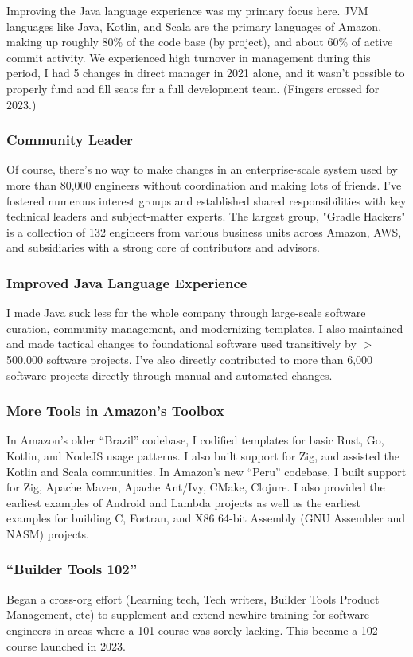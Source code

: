 \documentclass{article}
\begin{document}
Improving the Java language experience was my primary focus here. JVM languages
like Java, Kotlin, and Scala are the primary languages of Amazon, making up
roughly 80\% of the code base (by project), and about 60\% of active commit
activity. We experienced high turnover in management during this period, I had 5
changes in direct manager in 2021 alone, and it wasn't possible to properly fund
and fill seats for a full development team. (Fingers crossed for 2023.)

\subsubsection{Community Leader}
Of course, there's no way to make changes in an enterprise-scale system used by
more than 80,000 engineers without coordination and making lots of friends. I've
fostered numerous interest groups and established shared responsibilities with
key technical leaders and subject-matter experts. The largest group, "Gradle
Hackers" is a collection of 132 engineers from various business units across
Amazon, AWS, and subsidiaries with a strong core of contributors and advisors.

\subsubsection{Improved Java Language Experience}
I made Java suck less for the whole company through large-scale software
curation, community management, and modernizing templates. I also maintained
and made tactical changes to foundational software used transitively by
$>$500,000 software projects. I've also directly contributed to more than
6,000 software projects directly through manual and automated changes.

\subsubsection{More Tools in Amazon's Toolbox}
In Amazon's older ``Brazil'' codebase, I codified templates for basic Rust, Go,
Kotlin, and NodeJS usage patterns. I also built support for Zig, and assisted
the Kotlin and Scala communities. In Amazon's new ``Peru'' codebase, I built
support for Zig, Apache Maven, Apache Ant/Ivy, CMake, Clojure. I also provided
the earliest examples of Android and Lambda projects as well as the earliest
examples for building C, Fortran, and X86 64-bit Assembly (GNU Assembler and
NASM) projects.

\subsubsection{``Builder Tools 102''}
Began a cross-org effort (Learning tech, Tech writers, Builder Tools Product
Management, etc) to supplement and extend newhire training for software
engineers in areas where a 101 course was sorely lacking. This became a 102
course launched in 2023.
\end{document}
